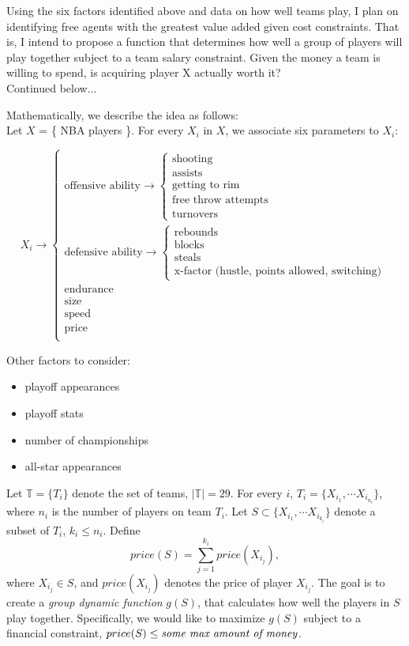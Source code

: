 \documentclass[11pt]{article}
\begin{document}
Using the six factors identified above and data on how well teams play, I plan on identifying free agents with the greatest value added given cost constraints. That is, I intend to propose a function that determines how well a group of players will play together subject to a team salary constraint. Given the money a team is willing to spend, is acquiring player X actually worth it?\\

Continued below...

\newpage
Mathematically, we describe the idea as follows:\\

Let $X$ = \{ NBA players \}.  For every $X_i$ in $X$, we associate six parameters to $X_i$:

$$
X_i \rightarrow
\begin{cases}
\text{offensive ability}
\rightarrow
	\begin{cases}
	\text{shooting} \\
	\text{assists} \\
	\text{getting to rim}\\
	\text{free throw attempts}\\
	\text{turnovers}
	\end{cases}\\
\text{defensive ability}
\rightarrow
	\begin{cases}
	\text{rebounds}\\
	\text{blocks}\\
	\text{steals}\\
	\text{x-factor (hustle, points allowed, switching)}
	\end{cases}\\
\text{endurance}\\
\text{size}\\
\text{speed}\\
\text{price}\\
\end{cases}
$$ 

Other factors to consider:
\begin{itemize}
\item playoff appearances
\item playoff stats
\item number of championships
\item all-star appearances
\end{itemize}

Let $\mathbb{T} = \{ T_i \}$ denote the set of teams, $|\mathbb{T}| = 29$. For every $i$, 
$T_i = \{ X_{i_1}, \cdots X_{i_{n_i}} \}$, where $n_i$ is the number of players on team $T_i$. Let
$S \subset \{ X_{i_1}, \cdots X_{i_{k_i}} \}$ denote a subset of $T_i$, $k_i \leq n_i$.  Define 
$$
price(S) = \sum_{j =1}^{k_i} price(X_{i_j}),
$$
where $X_{i_j} \in S$, and $price(X_{i_j})$ denotes the price of player $X_{i_j}$. The goal is to create a {\em group dynamic function} $g(S)$, that calculates how well the players in $S$ play together.  Specifically, we would like to maximize $g(S)$ subject to a financial constraint, $price (S) \leq \text{{\em some max amount of money}}$.
\end{document}

